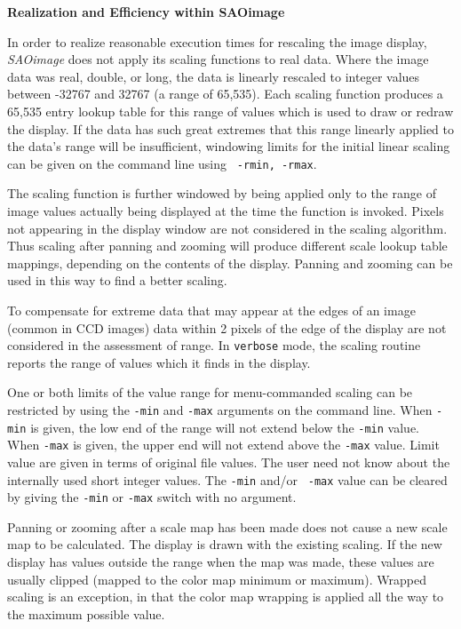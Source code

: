 {\bf Realization and Efficiency within SAOimage}
\par
\vspace{0.1in}
In order to realize reasonable execution times for rescaling the image
display, {\em SAOimage} does not apply its scaling functions to real
data.  Where the image data was real, double, or long, the data is
linearly rescaled to integer values between -32767 and 32767 (a range
of 65,535).  Each scaling function produces a 65,535 entry lookup
table for this range of values which is used to draw or redraw the
display.  If the data has such great extremes that this range linearly
applied to the data's range will be insufficient, windowing limits for
the initial linear scaling can be given on the command line using {\tt
-rmin, -rmax}.
\par
\vspace{0.1in}
The scaling function is further windowed by being applied only to the
range of image values actually being displayed at the time the
function is invoked.  Pixels not appearing in the display window are
not considered in the scaling algorithm.  Thus scaling after panning
and zooming will produce different scale lookup table mappings,
depending on the contents of the display.  Panning and zooming can be
used in this way to find a better scaling.
\par
\vspace{0.1in}
To compensate for extreme data that may appear at the edges of an image
(common in CCD images) data within 2 pixels of the edge of the display
are not considered in the assessment of range.  In {\tt verbose} mode,
the scaling routine reports the range of values which it finds in the
display.
\par
\vspace{0.1in}
One or both limits of the value range for menu-commanded scaling can
be restricted by using the {\tt -min} and {\tt -max} arguments on the
command line.  When {\tt -min} is given, the low end of the range will
not extend below the {\tt -min} value.  When {\tt -max} is given, the
upper end will not extend above the {\tt -max} value.  Limit value are
given in terms of original file values. The user need not know about
the internally used short integer values.  The {\tt -min} and/or {\tt
-max} value can be cleared by giving the {\tt -min} or {\tt -max}
switch with no argument.
\par
\vspace{0.1in}
Panning or zooming after a scale map has been made does not cause a new
scale map to be calculated.  The display is drawn with the existing
scaling.  If the new display has values outside the range when the map
was made, these values are usually clipped (mapped to the color map
minimum or maximum).  Wrapped scaling is an exception, in that the 
color map wrapping is applied all the way to the maximum possible
value.
\par
\vspace{0.1in}

